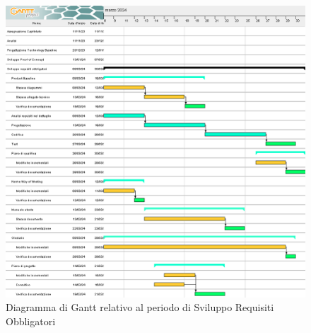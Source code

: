 \documentclass{article}
\begin{document}
\begin{figure}[H]
    \centering
    \includegraphics[width=\textwidth,height=\textheight,keepaspectratio]{documenti/grafici/diagramma-gantt-periodo-sviluppo-requisiti-obbligatori.png}
    \caption{Diagramma di Gantt relativo al periodo di Sviluppo Requisiti Obbligatori}
    \label{fig:GSRO}
\end{figure}
\end{document}
